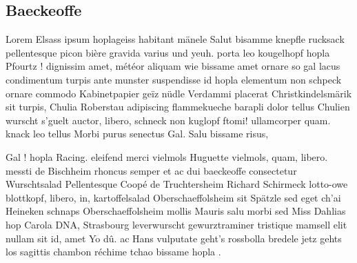 \documentclass[a4paper,11pt]{reportUDS}
\begin{document}
\subsection{Baeckeoffe}
Lorem Elsass ipsum hoplageiss habitant mänele Salut bisamme knepfle rucksack pellentesque picon bière gravida varius und yeuh. porta leo kougelhopf hopla Pfourtz ! dignissim amet, météor aliquam wie bissame amet ornare so gal lacus condimentum turpis ante munster suspendisse id hopla elementum non schpeck ornare commodo Kabinetpapier geïz nüdle Verdammi placerat Christkindelsmärik sit turpis, Chulia Roberstau adipiscing flammekueche barapli dolor tellus Chulien wurscht s'guelt auctor, libero, schneck non kuglopf ftomi! ullamcorper quam. knack leo tellus Morbi purus senectus Gal. Salu bissame risus,

Gal ! hopla Racing. eleifend merci vielmols Huguette vielmols, quam, libero. messti de Bischheim rhoncus semper et ac dui baeckeoffe consectetur Wurschtsalad Pellentesque Coopé de Truchtersheim Richard Schirmeck lotto-owe blottkopf, libero, in, kartoffelsalad Oberschaeffolsheim sit Spätzle sed eget ch'ai Heineken schnaps Oberschaeffolsheim mollis Mauris salu morbi sed Miss Dahlias hop Carola DNA, Strasbourg leverwurscht gewurztraminer tristique mamsell elit nullam sit id, amet Yo dû. ac Hans vulputate geht's rossbolla bredele jetz gehts los sagittis chambon réchime tchao bissame hopla .
\end{document}
